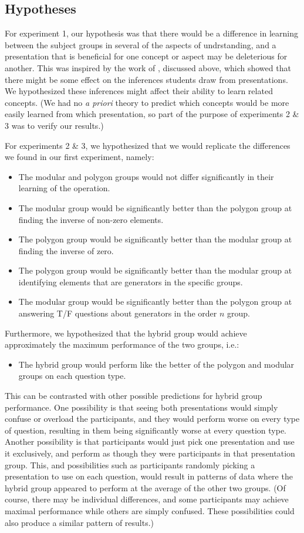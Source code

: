 \documentclass[man,10pt]{apa6}
\begin{document}
\subsection{Hypotheses}
For experiment 1, our hypothesis was that there would be a difference in learning between the subject groups in several of the aspects of undrstanding, and a presentation that is beneficial for one concept or aspect may be deleterious for another. This was inspired by the work of \cite{DeBock2011}, discussed above, which showed that there might be some effect on the inferences students draw from presentations. We hypothesized these inferences might affect their ability to learn related concepts. (We had no \emph{a priori} theory to predict which concepts would be more easily learned from which presentation, so part of the purpose of experiments 2 \& 3 was to verify our results.)\par
For experiments 2 \& 3, we hypothesized that we would replicate the differences we found in our first experiment, namely: 
\begin{itemize} 
\item The modular and polygon groups would not differ significantly in their learning of the operation.
\item The modular group would be significantly better than the polygon group at finding the inverse of non-zero elements.
\item The polygon group would be significantly better than the modular group at finding the inverse of zero.
\item The polygon group would be significantly better than the modular group at identifying elements that are generators in the specific groups.
\item The modular group would be significantly better than the polygon group at answering T/F questions about generators in the order $n$ group.
\end{itemize}
Furthermore, we hypothesized that the hybrid group would achieve approximately the maximum performance of the two groups, i.e.:
\begin{itemize}
\item The hybrid group would perform like the better of the polygon and modular groups on each question type. 
\end{itemize}
This can be contrasted with other possible predictions for hybrid group performance. One possibility is that seeing both presentations would simply confuse or overload the participants, and they would perform worse on every type of question, resulting in them being significantly worse at every question type. Another possibility is that participants would just pick one presentation and use it exclusively, and perform as though they were participants in that presentation group. This, and possibilities such as participants randomly picking a presentation to use on each question, would result in patterns of data where the hybrid group appeared to perform at the average of the other two groups. (Of course, there may be individual differences, and some participants may achieve maximal performance while others are simply confused. These possibilities could also produce a similar pattern of results.) \par
\end{document}
